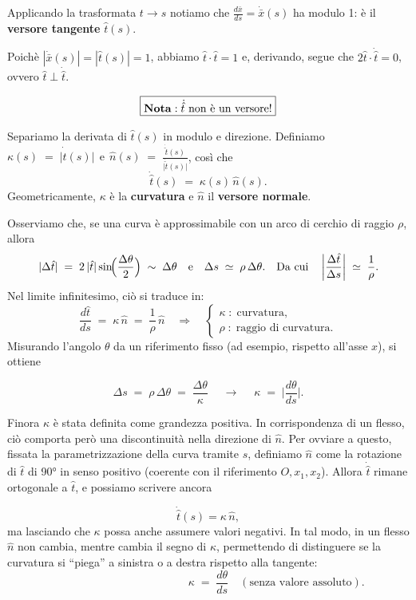 Applicando la trasformata $t \to s$ notiamo che $\tfrac{d\bar x}{ds} = \dot {\bar x}(s)$ ha modulo 1: è il \textbf{versore tangente} $\hat t(s)$.

Poichè $|\dot {\bar x}(s)| = |\hat t(s)| = 1$, abbiamo $\hat t \cdot {\hat t} = 1$ e, derivando, segue che $2 \hat t \cdot \dot {\hat t} = 0$, ovvero $\hat t \perp \dot {\hat t}$.

$$\boxed{\text{\textbf{Nota}}: \dot {\hat t} \text { non è un versore!}}$$

Separiamo la derivata di $\hat{t}(s)$ in modulo e direzione. Definiamo
$
\kappa(s) \;=\; \bigl|\dot{\hat{t}}(s)\bigr|
\ \ \text{e}\ \
\hat{n}(s) \;=\; \frac{\dot{\hat{t}}(s)}{\bigl|\dot{\hat{t}}(s)\bigr|}
$,
così che
$$
\dot{\hat{t}}(s) \;=\; \kappa(s)\,\hat{n}(s).
$$
Geometricamente, $\kappa$ è la \textbf{curvatura} e $\hat{n}$ il \textbf{versore normale}.

Osserviamo che, se una curva è approssimabile con un arco di cerchio di raggio $\rho$, allora
$$
|\Delta \hat{t}|
\;=\;
2\,|\hat{t}|\sin\!\Bigl(\frac{\Delta \theta}{2}\Bigr)
\;\sim\;
\Delta \theta
\quad\text{e}\quad
\Delta s
\;\simeq\;
\rho\,\Delta \theta.
\quad\text{Da cui}\quad
\left|\frac{\Delta \hat{t}}{\Delta s}\right|
\;\simeq\;
\frac{1}{\rho}.
$$
Nel limite infinitesimo, ciò si traduce in:
$$
\frac{d\hat{t}}{ds}
\;=\;
\kappa\,\hat{n}
\;=\;
\frac{1}{\rho}\,\hat{n}
\quad\Longrightarrow\quad
\begin{cases}
    \kappa\;:\;\text{curvatura},\\
    \rho\;:\;\text{raggio di curvatura}.
\end{cases}
$$
Misurando l’angolo $\theta$ da un riferimento fisso (ad esempio, rispetto all’asse $x$), si ottiene

$$
\Delta s
\;=\;
\rho\,\Delta \theta
\;=\;
\frac{\Delta \theta}{\kappa}
\quad\;\to\;\quad
\kappa
\;=\;
\biggl|\frac{d\theta}{ds}\biggr|.
$$

Finora $\kappa$ è stata definita come grandezza positiva. In corrispondenza di un flesso, ciò comporta però una discontinuità nella direzione di $\hat{n}$. Per ovviare a questo, fissata la parametrizzazione della curva tramite $s$, definiamo $\hat{n}$ come la rotazione di $\hat{t}$ di 90° in senso positivo (coerente con il riferimento $O,x_1,x_2$). Allora $\dot{\hat{t}}$ rimane ortogonale a $\hat{t}$, e possiamo scrivere ancora

\vspace{-1em}

$$\dot{\hat{t}}(s)=\kappa\,\hat{n},$$
ma lasciando che $\kappa$ possa anche assumere valori negativi. In tal modo, in un flesso $\hat{n}$ non cambia, mentre cambia il segno di $\kappa$, permettendo di distinguere se la curvatura si “piega” a sinistra o a destra rispetto alla tangente:
$$
\quad
\phantom{(\text{senza valore assoluto}).}
\kappa
\;=\;
\frac{d\theta}{ds}
\quad
(\text{senza valore assoluto}).
$$

